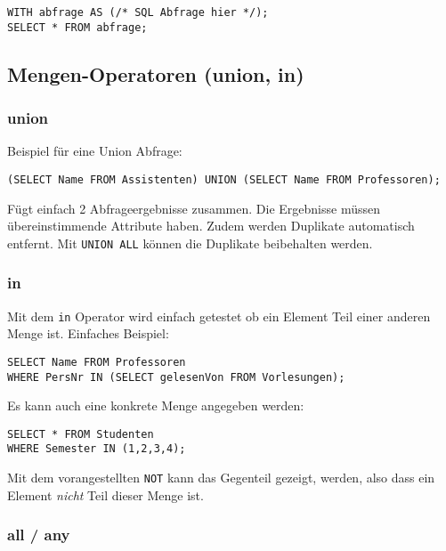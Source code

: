 \begin{lstlisting}[caption={with Operator},label=lst:with]
WITH abfrage AS (/* SQL Abfrage hier */);
SELECT * FROM abfrage;
\end{lstlisting}

\subsection{Mengen-Operatoren (union, in)}
\label{sec:mengen_operatoren}

\subsubsection{union}
Beispiel für eine Union Abfrage:

\begin{lstlisting}[caption={Union Abfrage Beispiel},label=lst:union_bsp]
(SELECT Name FROM Assistenten) UNION (SELECT Name FROM Professoren);
\end{lstlisting}

Fügt einfach 2 Abfrageergebnisse zusammen. Die Ergebnisse müssen übereinstimmende Attribute haben. Zudem werden Duplikate automatisch entfernt. Mit \texttt{UNION ALL} können die Duplikate beibehalten werden.

\subsubsection{in}
\label{sec:in_operator}

Mit dem \texttt{in} Operator wird einfach getestet ob ein Element Teil einer anderen Menge ist. Einfaches Beispiel:
\begin{lstlisting}[caption={Beispiel in Operator},label=lst:in_bsp]
SELECT Name FROM Professoren 
WHERE PersNr IN (SELECT gelesenVon FROM Vorlesungen);
\end{lstlisting}

Es kann auch eine konkrete Menge angegeben werden:

\begin{lstlisting}[caption={Diskrete Menge IN}]
SELECT * FROM Studenten
WHERE Semester IN (1,2,3,4);
\end{lstlisting}

Mit dem vorangestellten \texttt{NOT} kann das Gegenteil gezeigt, werden, also dass ein Element \textit{nicht} Teil dieser Menge ist.

\subsubsection{all / any}

